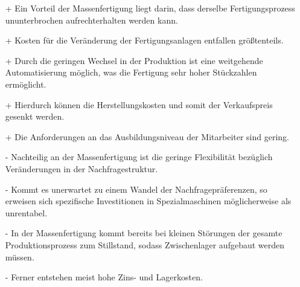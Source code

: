 {\begin{itemize}
    \item[+] Ein Vorteil der Massenfertigung liegt darin, dass derselbe Fertigungsprozess ununterbrochen aufrechterhalten werden kann.
    \item[+] Kosten für die Veränderung der Fertigungsanlagen entfallen größtenteils.
    \item[+] Durch die geringen Wechsel in der Produktion ist eine weitgehende Automatisierung möglich, was die Fertigung sehr hoher Stückzahlen ermöglicht.
    \item[+] Hierdurch können die Herstellungskosten und somit der Verkaufspreis gesenkt werden.
    \item[+] Die Anforderungen an das Ausbildungsniveau der Mitarbeiter sind gering.
    \item[-] Nachteilig an der Massenfertigung ist die geringe Flexibilität bezüglich Veränderungen in der Nachfragestruktur.
    \item[-] Kommt es unerwartet zu einem Wandel der Nachfragepräferenzen, so erweisen sich spezifische Investitionen in Spezialmaschinen möglicherweise als unrentabel.
    \item[-] In der Massenfertigung kommt bereits bei kleinen Störungen der gesamte Produktionsprozess zum Stillstand, sodass Zwischenlager aufgebaut werden müssen.
    \item[-] Ferner entstehen meist hohe Zins- und Lagerkosten.
\end{itemize}
}

